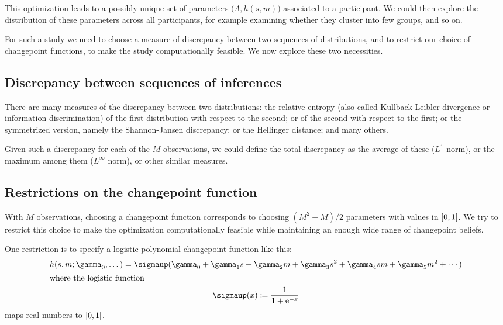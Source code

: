\documentclass[\ifafour a4paper,12pt,\else a5paper,10pt,\fi%
onecolumn,oneside,article,%
british%
]{memoir}
\theoremstyle{remark}
\theoremstyle{innote}
\newcommand*{\e}{\mathrm{e}}%
\newcommand*{\defd}{\coloneqq}
\DeclarePairedDelimiter\clcl{[}{]}
\renewcommand*{\|}{\mathpunct{|}}
\newcommand*{\yN}{\varLambda}
\newcommand*{\yrs}{h}
\newcommand*{\logistic}{\sigmaup}
\begin{document}
This optimization leads to a possibly unique set of parameters
$\bigl(\yN, \yrs(s,m)\bigr)$ associated to a participant. We could then
explore the distribution of these parameters across all participants, for
example examining whether they cluster into few groups, and so on.

For such a study we need to choose a measure of discrepancy between two
sequences of distributions, and to restrict our choice of changepoint
functions, to make the study computationally feasible. We now explore these
two necessities.

\subsection{Discrepancy between sequences of inferences}
\label{sec:discrepancy_measure}

There are many measures of the discrepancy between two distributions: the
relative entropy (also called Kullback-Leibler divergence or information
discrimination) of the first distribution with respect to the second; or of
the second with respect to the first; or the symmetrized version, namely the
Shannon-Jansen discrepancy; or the Hellinger distance; and many others.

Given such a discrepancy for each of the $M$ observations, we could define
the total discrepancy as the average of these ($L^1$ norm), or the maximum
among them ($L^{\infty}$ norm), or other similar measures.

\subsection{Restrictions on the changepoint function}
\label{sec:restrictions_h}

With $M$ observations, choosing a changepoint function corresponds to
choosing $(M^2-M)/2$ parameters with values in $\clcl{0,1}$. We try to
restrict this choice to make the optimization computationally feasible
while maintaining an enough wide range of changepoint beliefs.

One restriction is to specify a logistic-polynomial changepoint function
like this:
\begin{gather}
  \label{eq:changepoint_logistic_general}
  \yrs(s,m ; \gamma_0,\dotsc) =
  \logistic(\gamma_0 + \gamma_1 s + \gamma_2 m +
  \gamma_3 s^2 + \gamma_4 sm + \gamma_5 m^2 + \dotsb)
  \\
  \shortintertext{where the logistic function}
  \label{eq:logistic_def}
  \logistic(x) \defd \frac{1}{1+\e^{-x}} 
\end{gather}
maps real numbers to $\clcl{0,1}$.
\end{document}
